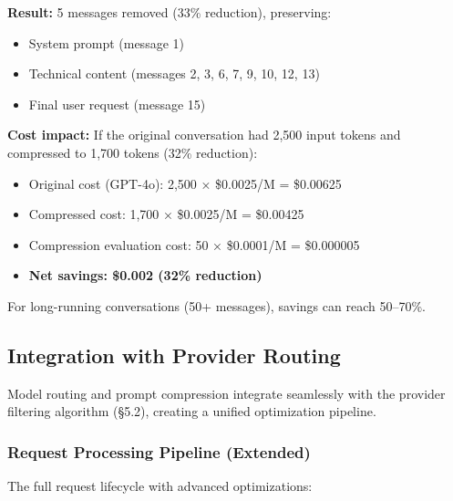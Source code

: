 \documentclass[english]{article}
\begin{document}
\textbf{Result:} 5 messages removed (33\% reduction), preserving:
\begin{itemize}
    \item System prompt (message 1)
    \item Technical content (messages 2, 3, 6, 7, 9, 10, 12, 13)
    \item Final user request (message 15)
\end{itemize}

\textbf{Cost impact:} If the original conversation had 2,500 input tokens and compressed to 1,700 tokens (32\% reduction):
\begin{itemize}
    \item Original cost (GPT-4o): 2,500 × \$0.0025/M = \$0.00625
    \item Compressed cost: 1,700 × \$0.0025/M = \$0.00425
    \item Compression evaluation cost: 50 × \$0.0001/M = \$0.000005
    \item \textbf{Net savings: \$0.002 (32\% reduction)}
\end{itemize}

For long-running conversations (50+ messages), savings can reach 50--70\%.

\subsection{Integration with Provider Routing}

Model routing and prompt compression integrate seamlessly with the provider filtering algorithm (§5.2), creating a unified optimization pipeline.

\subsubsection{Request Processing Pipeline (Extended)}

The full request lifecycle with advanced optimizations:
\end{document}
